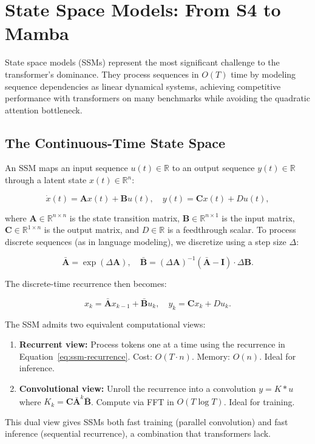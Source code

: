 \section{State Space Models: From S4 to Mamba}
\label{sec:ssm}

State space models (SSMs) represent the most significant challenge to the transformer's dominance. They process sequences in $O(T)$ time by modeling sequence dependencies as linear dynamical systems, achieving competitive performance with transformers on many benchmarks while avoiding the quadratic attention bottleneck.

\subsection{The Continuous-Time State Space}

An SSM maps an input sequence $u(t) \in \mathbb{R}$ to an output sequence $y(t) \in \mathbb{R}$ through a latent state $x(t) \in \mathbb{R}^n$:

\begin{equation}
\dot{x}(t) = \mathbf{A} x(t) + \mathbf{B} u(t), \quad y(t) = \mathbf{C} x(t) + D u(t),
\label{eq:ssm-continuous}
\end{equation}

where $\mathbf{A} \in \mathbb{R}^{n \times n}$ is the state transition matrix, $\mathbf{B} \in \mathbb{R}^{n \times 1}$ is the input matrix, $\mathbf{C} \in \mathbb{R}^{1 \times n}$ is the output matrix, and $D \in \mathbb{R}$ is a feedthrough scalar. To process discrete sequences (as in language modeling), we discretize using a step size $\Delta$:

\begin{equation}
\bar{\mathbf{A}} = \exp(\Delta \mathbf{A}), \quad \bar{\mathbf{B}} = (\Delta \mathbf{A})^{-1}(\bar{\mathbf{A}} - \mathbf{I}) \cdot \Delta \mathbf{B}.
\label{eq:ssm-discrete}
\end{equation}

The discrete-time recurrence then becomes:

\begin{equation}
x_k = \bar{\mathbf{A}} x_{k-1} + \bar{\mathbf{B}} u_k, \quad y_k = \mathbf{C} x_k + D u_k.
\label{eq:ssm-recurrence}
\end{equation}

\begin{keyinsight}
The SSM admits two equivalent computational views:
\begin{enumerate}[leftmargin=1.5em]
  \item \textbf{Recurrent view:} Process tokens one at a time using the recurrence in Equation~\ref{eq:ssm-recurrence}. Cost: $O(T \cdot n)$. Memory: $O(n)$. Ideal for inference.
  \item \textbf{Convolutional view:} Unroll the recurrence into a convolution $y = K * u$ where $K_k = \mathbf{C} \bar{\mathbf{A}}^k \bar{\mathbf{B}}$. Compute via FFT in $O(T \log T)$. Ideal for training.
\end{enumerate}
This dual view gives SSMs both fast training (parallel convolution) and fast inference (sequential recurrence), a combination that transformers lack.
\end{keyinsight}

